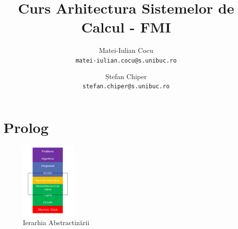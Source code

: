 \documentclass[a4paper,10pt]{article}
\title{\huge Curs Arhitectura Sistemelor de Calcul - FMI}
\author{
  Matei-Iulian Cocu\\
  \texttt{matei-iulian.cocu@s.unibuc.ro}
  \and
  Ștefan Chiper\\
  \texttt{stefan.chiper@s.unibuc.ro}
} \date{}
\begin{document}
\maketitle
\setcounter{tocdepth}{2}
\tableofcontents
\thispagestyle{empty}
\newpage

\section{Prolog}
\begin{figure}
    \centering
    \includegraphics[width=0.25\textwidth]{resources/ierarhia.png}
    \caption{Ierarhia Abstractizării}
\end{figure}
\end{document}
